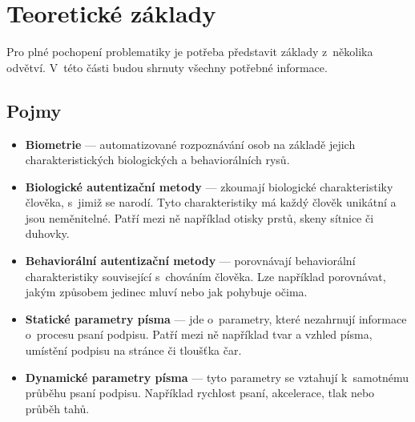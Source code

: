 
\chapter{Teoretické základy}
Pro plné pochopení problematiky je potřeba představit základy z~několika odvětví. 
V~této části budou shrnuty všechny potřebné informace. 

\section{Pojmy}\label{sec:pojmy}
\begin{itemize} 
  \item \textbf{Biometrie} --- automatizované rozpoznávání osob na základě jejich charakteristických biologických a behaviorálních rysů.~\cite{DrahanskýMartin2011} %
  \item \textbf{Biologické autentizační metody} --- zkoumají biologické charakteristiky člověka, s~jimiž se narodí. Tyto charakteristiky má každý člověk unikátní a jsou neměnitelné. Patří mezi ně například otisky prstů, skeny sítnice či duhovky.  
  \item \textbf{Behaviorální autentizační metody} --- porovnávají behaviorální charakteristiky související s~chováním člověka. Lze například porovnávat, jakým způsobem jedinec mluví nebo jak pohybuje očima.
  \item \textbf{Statické parametry písma} --- jde o~parametry, které nezahrnují informace o~procesu psaní podpisu. Patří mezi ně například tvar a vzhled písma, umístění podpisu na stránce či tloušťka čar.
  \item \textbf{Dynamické parametry písma} --- tyto parametry se vztahují k~samotnému průběhu psaní podpisu. Například rychlost psaní, akcelerace, tlak nebo průběh tahů.
\end{itemize}

